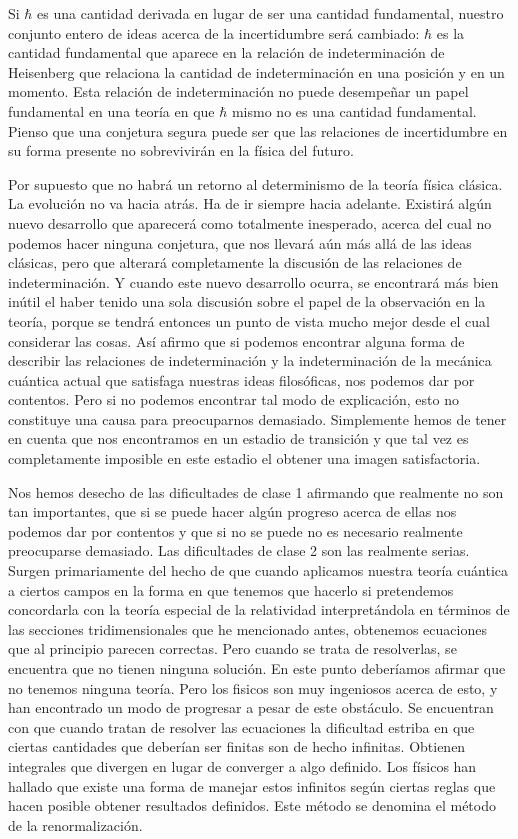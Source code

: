\documentclass[a4paper, 12pt]{article}
\begin{document}
Si $\hbar$ es una cantidad derivada en lugar de ser una cantidad fundamental, nuestro conjunto entero de ideas acerca de la incertidumbre será cambiado: $\hbar$ es la cantidad fundamental que aparece en la relación de indeterminación de Heisenberg que relaciona la cantidad de indeterminación en una posición y en un momento. Esta relación de indeterminación no puede desempeñar un papel fundamental en una teoría en que $\hbar$ mismo no es una cantidad fundamental. Pienso que una conjetura segura puede ser que las relaciones de incertidumbre en su forma presente no sobrevivirán en la física del futuro.

Por supuesto que no habrá un retorno al determinismo de la teoría física clásica. La evolución no va hacia atrás. Ha de ir siempre hacia adelante. Existirá algún nuevo desarrollo que aparecerá como totalmente inesperado, acerca del cual no podemos hacer ninguna conjetura, que nos llevará aún más allá de las ideas clásicas, pero que alterará completamente la discusión de las relaciones de indeterminación. Y cuando este nuevo desarrollo ocurra, se encontrará más bien inútil el haber tenido una sola discusión sobre el papel de la observación en la teoría, porque se tendrá entonces un punto de vista mucho mejor desde el cual considerar las cosas. Así afirmo que si podemos encontrar alguna forma de describir las relaciones de indeterminación y la indeterminación de la mecánica cuántica actual que satisfaga nuestras ideas filosóficas, nos podemos dar por contentos. Pero si no podemos encontrar tal modo de explicación, esto no constituye una causa para preocuparnos demasiado. Simplemente hemos de tener en cuenta que nos encontramos en un estadio de transición y que tal vez es completamente imposible en este estadio el obtener una imagen satisfactoria. 



Nos hemos desecho de las dificultades de clase 1 afirmando que realmente no son tan importantes, que si se puede hacer algún progreso acerca de ellas nos podemos dar por contentos y que si no se puede no es necesario realmente preocuparse demasiado. Las dificultades de clase 2 son las realmente serias. Surgen primariamente del hecho de que cuando aplicamos nuestra teoría cuántica a ciertos campos en la forma en que tenemos que hacerlo si pretendemos concordarla con la teoría especial de la relatividad interpretándola en términos de las secciones tridimensionales que he mencionado antes, obtenemos ecuaciones que al principio parecen correctas. Pero cuando se trata de resolverlas, se encuentra que no tienen ninguna solución. En este punto deberíamos afirmar que no tenemos ninguna teoría. Pero los fisicos son muy ingeniosos acerca de esto, y han encontrado un modo de progresar a pesar de este obstáculo. Se encuentran con que cuando tratan de resolver las ecuaciones la dificultad estriba en que ciertas cantidades que deberían ser finitas son de hecho infinitas. Obtienen integrales que divergen en lugar de converger a algo definido. Los físicos han hallado que existe una forma de manejar estos infinitos según ciertas reglas que hacen posible obtener resultados definidos. Este método se denomina el método de la renormalización.
\end{document}
